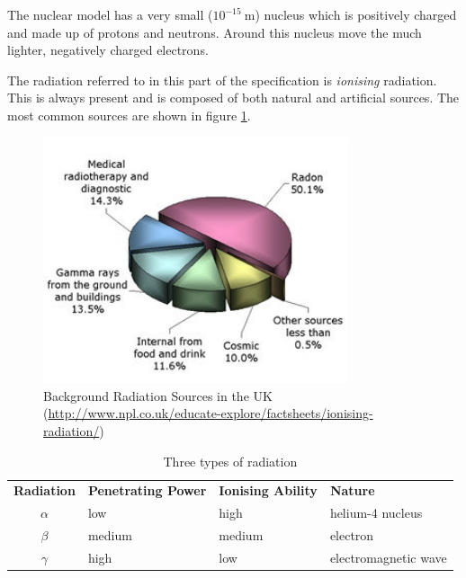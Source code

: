 \documentclass[main.tex]{subfiles}
\begin{document}

The nuclear model has a very small ($10^{-15}\ \si{\meter}$) nucleus which is positively charged and made up of protons and neutrons. Around this nucleus move the much lighter, negatively charged electrons.


The radiation referred to in this part of the specification is \emph{ionising} radiation. This is always present and is composed of both natural and artificial sources. The most common sources are shown in figure \ref{fig:rad-sources}.

\begin{figure}[h]
  \begin{center}
  \includegraphics[width=0.8\textwidth]{figs/chapt-8/rad-sources.jpg}
\end{center}
  \caption{Background Radiation Sources in the UK (\url{http://www.npl.co.uk/educate-explore/factsheets/ionising-radiation/})}
  \label{fig:rad-sources}
\end{figure}


\begin{table}[h]
\begin{tabular}{clll}
  \textbf{Radiation} & \textbf{Penetrating Power} & \textbf{Ionising Ability} & \textbf{Nature} \\
  $\alpha$ & low & high & helium-4 nucleus \\
  $\beta$ & medium & medium & electron \\
  $\gamma$ & high & low & electromagnetic wave \\
\end{tabular}
\caption{Three types of radiation}
\label{tbl:3-rad}
\end{table}
\end{document}
